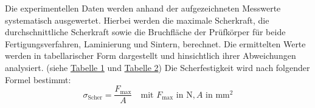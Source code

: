 Die experimentellen Daten werden anhand der aufgezeichneten Messwerte systematisch ausgewertet. Hierbei werden die maximale Scherkraft, die durchschnittliche Scherkraft sowie die Bruchfläche der Prüfkörper für beide Fertigungsverfahren, Laminierung und Sintern, berechnet. Die ermittelten Werte werden in tabellarischer Form dargestellt und hinsichtlich ihrer Abweichungen analysiert. (siehe \hyperref[Tab.1]{Tabelle 1} und \hyperref[Tab.2]{Tabelle 2})
Die Scherfestigkeit wird nach folgender Formel bestimmt:
\begin{equation}
    \sigma_{\text{Scher}} = \frac{F_{\text{max}}}{A} \quad \text{mit } F_{\text{max}} \text{ in } \si{\newton}, A \text{ in } \si{\milli\meter\squared}
\end{equation}

\begin{table}[H]
\centering

\adjustbox{max width=\textwidth}{



\renewcommand{\arraystretch}{1.7} %
\fontsize{18pt}{20pt}\selectfont
\begin{tabular}{|l|c|c|c|c|}
\hline
\textbf{Scherkörper} & \multicolumn{1}{l|}{\textbf{Maximale Scherkraft} {[}\si{\newton}{]}} & \multicolumn{1}{l|}{\textbf{Durchschnittskraft} {[}\si{\newton}{]}} & \multicolumn{1}{l|}{\textbf{Fläche} {[}\si{\milli\meter\squared}{]}} & \multicolumn{1}{l|}{\textbf{Scherfestigkeit} {[}\si{\newton\per\milli\meter\squared}{]}} \\ \hline
\textbf{1} & 330,45 & 143,11 & 5,29 & 62,47 \\ \hline
\textbf{2} & 459,23 & 137,78 & 5,29 & 86,81 \\ \hline
\textbf{3} & 420,47 & 135,23 & 5,29 & 79,48 \\ \hline
\textbf{4} & 384,35 & 148,57 & 5,29 & 72,66 \\ \hline
\textbf{5} & 508,97 & 172,81 & 5,29 & 96,21 \\ \hline
\textbf{6} & 358,84 & 116,34 & 5,29 & 67,83 \\ \hline
\textbf{7} & 388,41 & 143,01 & 5,29 & 73,42 \\ \hline
\textbf{8} & 354,98 & 140,97 & 5,29 & 67,10 \\ \hline
\end{tabular}}
\vspace{0.5cm}
\caption{Messung der gesinterten Scherkörper}
\label{Tab.1}
\end{table}




